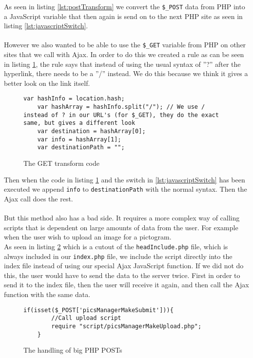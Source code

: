 As seen in listing \ref{lst:postTransform} we convert the \texttt{\$\_POST} data from PHP into a JavaScript variable that then again is send on to the next PHP site as seen in listing \ref{lst:javascriptSwitch}.\\
\\
However we also wanted to be able to use the \texttt{\$\_GET} variable from PHP on other sites that we call with Ajax. In order to do this we created a rule as can be seen in listing \ref{lst:getData}, the rule says that instead of using the usual syntax of ''?'' after the hyperlink, there needs to be a ''/'' instead. We do this because we think it gives a better look on the link itself.\\

\lstset{language=Java}
\begin{figure}[htbp]
\begin{lstlisting}[firstline=1]
    var hashInfo = location.hash;    
	var hashArray = hashInfo.split("/"); // We use / instead of ? in our URL's (for $_GET), they do the exact same, but gives a different look
	var destination = hashArray[0];
	var info = hashArray[1];
	var destinationPath = "";
\end{lstlisting}
\caption{The GET transform code}
\label{lst:getData}
\end{figure}

Then when the code in listing \ref{lst:getData} and the switch in \ref{lst:javascriptSwitch} has been executed we append \texttt{info} to \texttt{destinationPath} with the normal syntax. Then the Ajax call does the rest.\\
\\
But this method also has a bad side. It requires a more complex way of calling scripts that is dependent on large amounts of data from the user. For example when the user wish to upload an image for a pictogram.\\
As seen in listing \ref{lst:largePost} which is a cutout of the \texttt{headInclude.php} file, which is always included in our \texttt{index.php} file, we include the script directly into the index file instead of using our special Ajax JavaScript function. If we did not do this, the user would have to send the data to the server twice. First in order to send it to the index file, then the user will receive it again, and then call the Ajax function with the same data.\\

\lstset{language=PHP}
\begin{figure}[htbp]
\begin{lstlisting}[firstline=1]
	if(isset($_POST['picsManagerMakeSubmit'])){
		//Call upload script
		require "script/picsManagerMakeUpload.php";
	}
\end{lstlisting}
\caption{The handling of big PHP POSTs}
\label{lst:largePost}
\end{figure}

